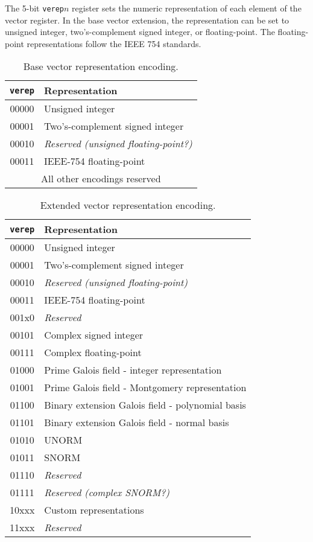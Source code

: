The 5-bit {\tt verep}$n$ register sets the numeric representation of
each element of the vector register.  In the base vector
extension, the representation can be set to unsigned integer,
two's-complement signed integer, or floating-point.  The
floating-point representations follow the IEEE 754 standards.

\begin{table}[hbtp]
  \centering
  \begin{tabular}{|c|l|}
    \hline
    {\tt verep} & Representation \\
    \hline
    00000 & Unsigned integer \\
    00001 & Two's-complement signed integer \\
    00010 & {\em Reserved (unsigned floating-point?)}\\
    00011 & IEEE-754 floating-point \\
    \hline
    \multicolumn{2}{|c|}{All other encodings reserved}\\
    \hline
  \end{tabular}
  \caption{Base vector representation encoding.}
  \label{tab:verep}
\end{table}

\begin{table}[hbtp]
  \centering
  \begin{tabular}{|c|l|}
    \hline
    {\tt verep} & Representation \\
    \hline
    00000 & Unsigned integer \\
    00001 & Two's-complement signed integer \\
    00010 & {\em Reserved (unsigned floating-point)}\\
    00011 & IEEE-754 floating-point \\
    \hline
    001x0 & {\em Reserved} \\
    00101 & Complex signed integer \\
    00111 & Complex floating-point \\
    \hline
    01000 & Prime Galois field - integer representation \\
    01001 & Prime Galois field - Montgomery representation \\
    01100 & Binary extension Galois field - polynomial basis \\
    01101 & Binary extension Galois field - normal basis \\
    \hline
    01010 & UNORM \\
    01011 & SNORM \\
    01110 & {\em Reserved} \\
    01111 & {\em Reserved (complex SNORM?)} \\
    \hline
    10xxx & Custom representations \\
    \hline
    11xxx & {\em Reserved} \\
    \hline
  \end{tabular}
  \caption{Extended vector representation encoding.}
  \label{tab:extverep}
\end{table}


